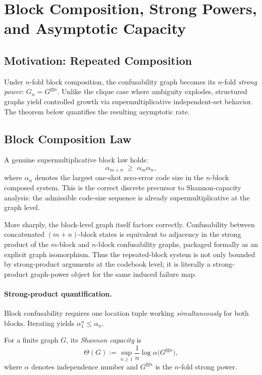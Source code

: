 \section{Block Composition, Strong Powers, and Asymptotic Capacity}\label{sec:capacity-theory}

\subsection{Motivation: Repeated Composition}

Under $n$-fold block composition, the confusability graph becomes its $n$-fold \emph{strong power}: $G_n = G^{\boxtimes n}$. Unlike the clique case where ambiguity explodes, structured graphs yield controlled growth via supermultiplicative independent-set behavior. The theorem below quantifies the resulting asymptotic rate.

\subsection{Block Composition Law}

A genuine supermultiplicative block law holds:
\[
\alpha_{m+n}\;\ge\;\alpha_m\alpha_n,
\]
where $\alpha_n$ denotes the largest one-shot zero-error code size in the $n$-block composed system. This is the correct discrete precursor to Shannon-capacity analysis: the admissible code-size sequence is already supermultiplicative at the graph level.

More sharply, the block-level graph itself factors correctly. Confusability between concatenated $(m+n)$-block states is equivalent to adjacency in the strong product of the $m$-block and $n$-block confusability graphs, packaged formally as an explicit graph isomorphism. Thus the repeated-block system is not only bounded by strong-product arguments at the codebook level; it is literally a strong-product graph-power object for the same induced failure map.

\paragraph{Strong-product quantification.}
Block confusability requires one location tuple working \emph{simultaneously} for both blocks. Iterating yields $\alpha_1^n \le \alpha_n$.

\begin{definition}\label{def:shannon-capacity}
For a finite graph $G$, its \emph{Shannon capacity} is
\[
\Theta(G) := \sup_{n\ge 1} \frac{1}{n}\log \alpha\bigl(G^{\boxtimes n}\bigr),
\]
where $\alpha$ denotes independence number and $G^{\boxtimes n}$ is the $n$-fold strong power.
\end{definition}

